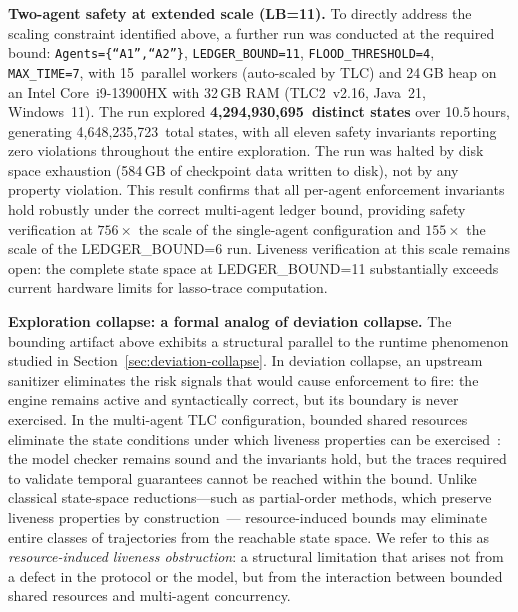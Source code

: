 \documentclass[11pt]{article}
\theoremstyle{definition}
\begin{document}
\smallskip
\noindent\textbf{Two-agent safety at extended scale (LB=11).}
To directly address the scaling constraint identified above, a further run was
conducted at the required bound:
\texttt{Agents=\{``A1'',``A2''\}}, \texttt{LEDGER\_BOUND=11},
\texttt{FLOOD\_THRESHOLD=4}, \texttt{MAX\_TIME=7},
with 15~parallel workers (auto-scaled by TLC) and 24\,GB heap on an
Intel Core~i9-13900HX with 32\,GB RAM
(TLC2~v2.16, Java~21, Windows~11).
The run explored \textbf{4,294,930,695~distinct states} over
10.5\,hours, generating 4,648,235,723~total states,
with all eleven safety invariants reporting zero violations
throughout the entire exploration.
The run was halted by disk space exhaustion
(584\,GB of checkpoint data written to disk),
not by any property violation.
This result confirms that all per-agent enforcement invariants hold robustly
under the correct multi-agent ledger bound, providing safety verification at
$756\times$ the scale of the single-agent configuration and
$155\times$ the scale of the LEDGER\_BOUND=6 run.
Liveness verification at this scale remains open: the complete state space
at LEDGER\_BOUND=11 substantially exceeds current hardware limits for
lasso-trace computation.

\smallskip
\noindent\textbf{Exploration collapse: a formal analog of deviation collapse.}
The bounding artifact above exhibits a structural parallel to the runtime
phenomenon studied in Section~\ref{sec:deviation-collapse}.
In deviation collapse, an upstream sanitizer eliminates the risk signals that
would cause enforcement to fire: the engine remains active and syntactically
correct, but its boundary is never exercised.
In the multi-agent TLC configuration, bounded shared resources eliminate the
state conditions under which liveness properties can be
exercised~\cite{pnueli1977temporal, alpern1985defining}:
the model checker remains sound and the invariants hold, but the traces
required to validate temporal guarantees cannot be reached within the bound.
Unlike classical state-space reductions---such as partial-order methods,
which preserve liveness properties by construction~\cite{baier2008principles}---
resource-induced bounds may eliminate entire classes of trajectories from the
reachable state space.
We refer to this as \emph{resource-induced liveness obstruction}:
a structural limitation that arises not from a defect in the protocol or the
model, but from the interaction between bounded shared resources and
multi-agent concurrency.
\end{document}
